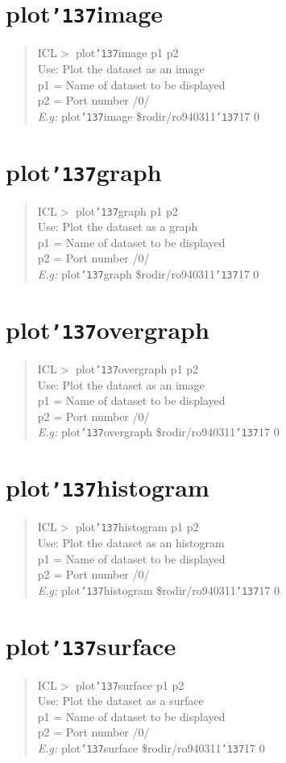 \documentclass[a4paper]{book}
\renewcommand{\_}{{\tt\char'137}}
\begin{document}
\section{plot\_image}
\begin{quote}
ICL$>$ plot\_image p1 p2 \\
Use: Plot the dataset as an image \\
p1 = Name of dataset to be displayed \\
p2 = Port number /0/ \\
{\em E.g:} plot\_image \$rodir/ro940311\_17 0
\end{quote}
\section{plot\_graph}
\begin{quote}
ICL$>$ plot\_graph p1 p2 \\
Use: Plot the dataset as a graph \\
p1 = Name of dataset to be displayed \\
p2 = Port number /0/ \\
{\em E.g:} plot\_graph \$rodir/ro940311\_17 0
\end{quote}
\section{plot\_overgraph}
\begin{quote}
ICL$>$ plot\_overgraph p1 p2 \\
Use: Plot the dataset as an image \\
p1 = Name of dataset to be displayed \\
p2 = Port number /0/ \\
{\em E.g:} plot\_overgraph \$rodir/ro940311\_17 0
\end{quote}
\section{plot\_histogram}
\begin{quote}
ICL$>$ plot\_histogram p1 p2 \\
Use: Plot the dataset as an histogram \\
p1 = Name of dataset to be displayed \\
p2 = Port number /0/ \\
{\em E.g:} plot\_histogram \$rodir/ro940311\_17 0
\end{quote}
\section{plot\_surface}
\begin{quote}
ICL$>$ plot\_surface p1 p2 \\
Use: Plot the dataset as a surface \\
p1 = Name of dataset to be displayed \\
p2 = Port number /0/ \\
{\em E.g:} plot\_surface \$rodir/ro940311\_17 0
\end{quote}
\end{document}
